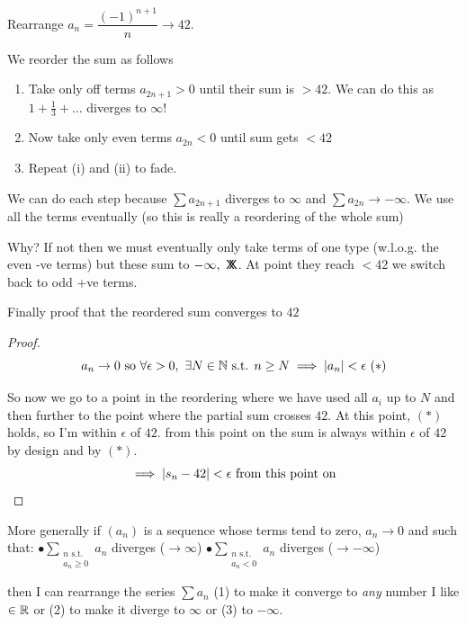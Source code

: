 \documentclass[10pt,twoside]{scrartcl}
\newcommand*{\cont}{%
  \mathsf{X}\mkern-8.5mu\mathsf{X}%
}
\begin{document}
\begin{example}
Rearrange $a_n = \dfrac{(-1)^{n+1}}{n} \to 42$. 

We reorder the sum as follows
\begin{enumerate}
\item Take only off terms $a_{2n+1} > 0$ until their sum is $>42$. We can do this as $1 + \frac{1}{3} + \dots$ diverges to $\infty$!
\item Now take only even terms $a_{2n} < 0$ until sum gets $<42$
\item Repeat (i) and (ii) to fade.
\end{enumerate}


We can do each step because $\sum a_{2n+1}$ diverges to $\infty$ and $\sum a_{2n}\to -\infty$. We use all the terms eventually (so this is really a reordering of the whole sum)

Why? If not then we must eventually only take terms of one type (w.l.o.g. the even -ve terms) but these sum to $-\infty,~\cont$. At point they reach $<42$ we switch back to odd +ve terms.

Finally proof that the reordered sum converges to $42$ 
\begin{proof}
\[a_n \to 0 \text{ so }\forall \epsilon >0,~\exists N \in\mathbb{N} \text{ s.t. } n \geq N \implies |a_n| < \epsilon ~(*)\]

So now we go to a point in the reordering where we have used all $a_i$ up to $N$ and then further to the point where the partial sum crosses $42$. At this point, $(*)$ holds, so I'm within $\epsilon$ of $42$. from this point on the sum is always within $\epsilon$ of $42$ by design and by $(*)$. 
\[\implies |s_n - 42| < \epsilon \text{ from this point on}\qedhere\]
\end{proof}
\end{example}\vspace*{5pt}


More generally 
 if $(a_n)$ is a sequence whose terms tend to zero, $a_n \to 0$ and such that:\vspace*{5pt}
 \quad 
 $\bullet \displaystyle{\sum_{\substack{n \text{ s.t.} \\a_n \geq 0}} a_n}$ diverges ($\to \infty$) \quad 
 $\bullet \displaystyle{\sum_{\substack{n \text{ s.t.}\\ a_n < 0}}  a_n}$ diverges ($\to -\infty$)	
 
 then I can rearrange the series $\sum a_n$ (1) to make it converge to \emph{any} number I like $\in\mathbb{R}$ or (2) to  make it diverge to $\infty$ or (3) to $-\infty$. 
 
\end{document}
